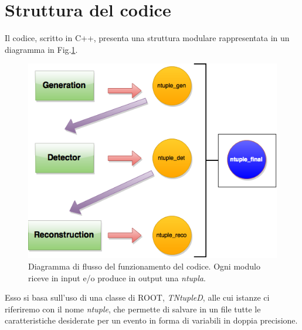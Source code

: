 \documentclass[8pt]{extarticle}
\begin{document}
\section{Struttura del codice} \label{sec:script}
Il codice, scritto in C++, presenta una struttura modulare rappresentata in un diagramma in Fig.\ref{fig:script_structure}.

\begin{figure}
	\begin{center}
		\includegraphics[scale=0.4]{script_structure}
		\caption{Diagramma di flusso del funzionamento del codice. Ogni modulo riceve in input e/o produce in output una \textit{ntupla}.}
		\label{fig:script_structure}
	\end{center}
\end{figure}

Esso si basa sull'uso di una classe di ROOT, \textit{TNtupleD},  alle cui istanze ci riferiremo con il nome \textit{ntuple}, che permette di salvare in un file tutte le caratteristiche desiderate per un evento in forma di variabili in doppia precisione. \\
\end{document}
